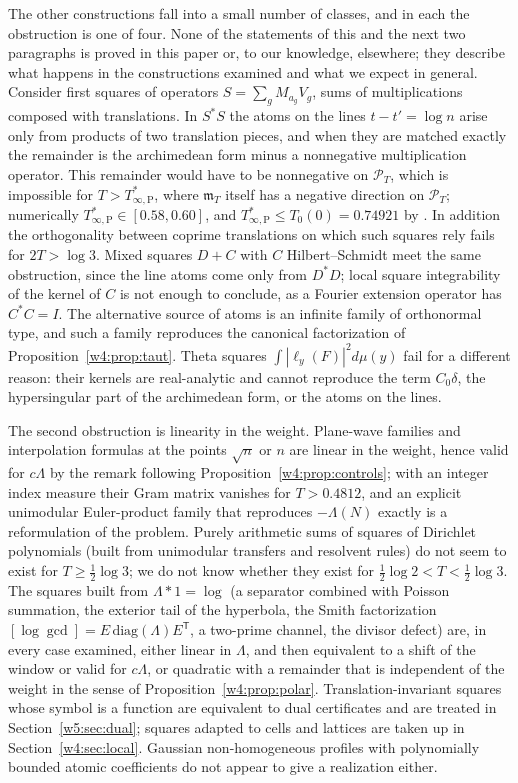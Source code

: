 \documentclass[11pt]{amsart}
\theoremstyle{definition}
\theoremstyle{remark}
\numberwithin{equation}{section}
\newcommand{\PT}{\mathcal{P}_T}                        %
\newcommand{\mT}{\mathfrak{m}_T}                       %
\newcommand{\Tarch}{T^{*}_{\infty,\mathrm P}}          %
\begin{document}
The other constructions fall into a small number of classes, and in each the obstruction is one of four. None of the
statements of this and the next two paragraphs is proved in this paper or, to our knowledge, elsewhere; they describe what
happens in the constructions examined and what we expect in general. Consider first squares of operators
$S=\sum_gM_{a_g}V_g$, sums of multiplications composed with translations. In $S^*S$ the atoms on the lines
$t-t'=\log n$ arise only from products of two translation pieces, and when they are matched exactly the remainder is the
archimedean form minus a nonnegative multiplication operator. This remainder would have to be nonnegative on $\PT$,
which is impossible for $T>\Tarch$, where $\mT$ itself has a negative direction on $\PT$; numerically
$\Tarch\in[0.58,0.60]$, and $\Tarch\le T_0(0)=0.74921$ by \cite[Proposition~7.1]{P46}. In addition the orthogonality
between coprime translations on which such squares rely fails for $2T>\log3$. Mixed squares $D+C$ with $C$
Hilbert--Schmidt meet the same obstruction, since the line atoms come only from $D^*D$; local square integrability of
the kernel of $C$ is not enough to conclude, as a Fourier extension operator has $C^*C=I$. The alternative source of
atoms is an infinite family of orthonormal type, and such a family reproduces the canonical factorization of
Proposition~\ref{w4:prop:taut}. Theta squares $\int|\ell_y(F)|^2d\mu(y)$ fail for a different reason: their kernels are
real-analytic and cannot reproduce the term $C_0\delta$, the hypersingular part of the archimedean form, or the atoms on
the lines.

The second obstruction is linearity in the weight. Plane-wave families and interpolation formulas at the points
$\sqrt n$ or $n$ are linear in the weight, hence valid for $c\Lambda$ by the remark following
Proposition~\ref{w4:prop:controls}; with an integer index measure their Gram matrix vanishes for $T>0.4812$, and an explicit
unimodular Euler-product family that reproduces $-\Lambda(N)$ exactly is a reformulation of the problem. Purely
arithmetic sums of squares of Dirichlet polynomials (built from unimodular transfers and resolvent rules) do not seem
to exist for $T\ge\frac12\log3$; we do not know whether they exist for $\frac12\log2<T<\frac12\log3$. The squares built
from $\Lambda*1=\log$ (a separator combined with Poisson summation, the exterior tail of the hyperbola, the Smith
factorization $[\log\gcd]=E\,\mathrm{diag}(\Lambda)E^{\mathsf T}$, a two-prime channel, the divisor defect) are, in
every case examined, either linear in $\Lambda$, and then equivalent to a shift of the window or valid for $c\Lambda$,
or quadratic with a remainder that is independent of the weight in the sense of Proposition~\ref{w4:prop:polar}.
Translation-invariant squares whose symbol is a function are equivalent to dual certificates and are treated in
Section~\ref{w5:sec:dual}; squares adapted to cells and lattices are taken up in Section~\ref{w4:sec:local}. Gaussian
non-homogeneous profiles with polynomially bounded atomic coefficients do not appear to give a realization either.
\end{document}
